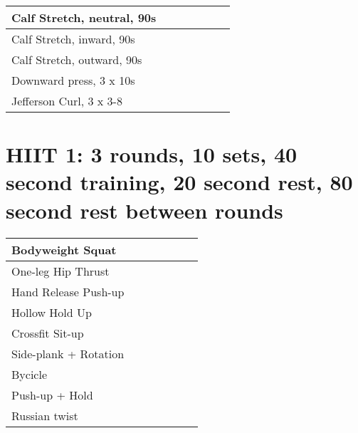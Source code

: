 \documentclass{article}
\begin{document}
\begin{landscape}
\noindent\begin{tabularx}{\columnwidth}{ |l|*{6}{R|} }
  \hline
  Calf Stretch, neutral, 90s        &&&&&&    \\
  \hline                                        
  Calf Stretch, inward, 90s         &&&&&&    \\
  \hline                                        
  Calf Stretch, outward, 90s        &&&&&&    \\
  \hline                                        
  Downward press, 3 x 10s           &&&&&&    \\
  \hline                                        
  Jefferson Curl, 3 x 3-8           &&&&&&    \\
  \hline
\end{tabularx}


\renewcommand{\arraystretch}{2.2}

\section*{HIIT 1:  3 rounds, 10 sets, 40 second training, 20 second rest, 80 second rest between rounds}

\noindent\begin{tabularx}{\columnwidth}{ |l|*{6}{R|} }
  \hline
  Bodyweight Squat                 &&&&&&    \\
  \hline                                        
  One-leg Hip Thrust               &&&&&&    \\
  \hline                                        
  Hand Release Push-up             &&&&&&    \\
  \hline                                        
  Hollow Hold Up                   &&&&&&    \\
  \hline                                        
  Crossfit Sit-up                  &&&&&&    \\
  \hline                                        
  Side-plank + Rotation            &&&&&&    \\
  \hline                                        
  Bycicle                          &&&&&&    \\
  \hline                                        
  Push-up + Hold                   &&&&&&    \\
  \hline                                        
  Russian twist                    &&&&&&    \\
  \hline
\end{tabularx}


\end{landscape}
\end{document}
